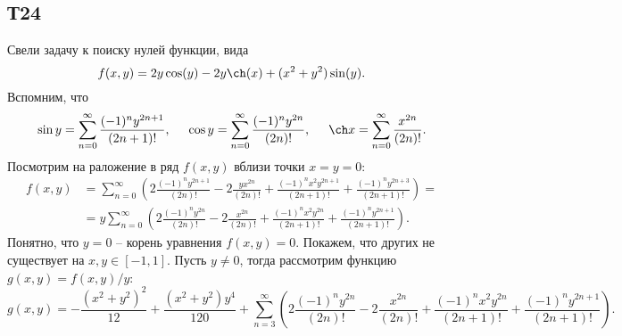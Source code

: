 \subsection*{Т24}


Свели задачу к поиску нулей функции, вида
\begin{equation*}
    f(x, y) = 2 y \cos(y) - 2 y \ch(x) + (x^2 + y^2) \sin(y).
\end{equation*}
Вспомним, что
\begin{equation*}
    \sin y = \sum_{n=0}^{\infty} \frac{(-1)^n y^{2n+1}}{(2n+1)!},
    \hspace{5 mm} 
    \cos y = \sum_{n=0}^{\infty} \frac{(-1)^n y^{2n}}{(2n)!},
    \hspace{5 mm} 
    \ch x = \sum_{n=0}^{\infty} \frac{x^{2n}}{(2n)!}.
\end{equation*}
Посмотрим на раложение в ряд $f(x, y)$ вблизи точки $x = y = 0$:
\begin{align*}
    f(x, y) &= \sum_{n=0}^{\infty} \left(
        2 \frac{(-1)^n y^{2n+1}}{(2n)!} - 2 \frac{y x^{2n}}{(2n)!} + 
        \frac{(-1)^n x^2 y^{2n+1}}{(2n +1)!} + \frac{(-1)^n y^{2n+3}}{(2n+1)!}
    \right) 
    = \\ &= 
    y \sum_{n=0}^{\infty} \left(
        2 \frac{(-1)^n y^{2n}}{(2n)!} - 2 \frac{x^{2n}}{(2n)!} + 
        \frac{(-1)^n x^2 y^{2n}}{(2n +1)!} + \frac{(-1)^n y^{2n+1}}{(2n+1)!}
    \right).
\end{align*}
Понятно, что $y=0$ -- корень уравнения $f(x, y) = 0$. Покажем, что других не существует на $x, y \in[-1, 1]$. Пусть $y \neq 0$, тогда рассмотрим функцию $g(x, y) = f(x, y)/y$:
\begin{equation*}
    g(x, y) = - \frac{(x^2 + y^2)^2}{12} + \frac{(x^2+y^2)y^4}{120} + \sum_{n=3}^{\infty} \left(
        2 \frac{(-1)^n y^{2n}}{(2n)!} - 2 \frac{x^{2n}}{(2n)!} + 
        \frac{(-1)^n x^2 y^{2n}}{(2n +1)!} + \frac{(-1)^n y^{2n+1}}{(2n+1)!}
    \right).
\end{equation*}

